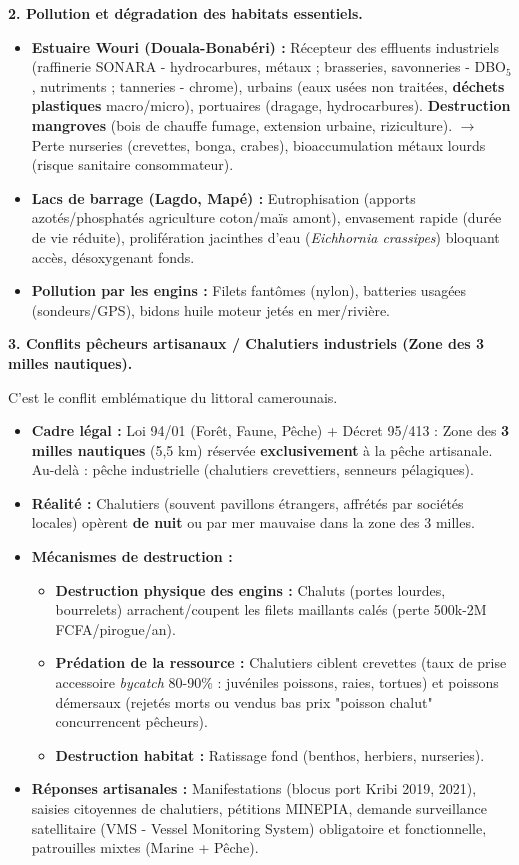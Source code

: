 \documentclass[11pt]{article}
\begin{document}
\textbf{2. Pollution et dégradation des habitats essentiels.}\par
\begin{itemize}
\item \textbf{Estuaire Wouri (Douala-Bonabéri) :} Récepteur des effluents industriels (raffinerie SONARA - hydrocarbures, métaux ; brasseries, savonneries - DBO$_5$, nutriments ; tanneries - chrome), urbains (eaux usées non traitées, \textbf{déchets plastiques} macro/micro), portuaires (dragage, hydrocarbures). \textbf{Destruction mangroves} (bois de chauffe fumage, extension urbaine, riziculture). $\rightarrow$ Perte nurseries (crevettes, bonga, crabes), bioaccumulation métaux lourds (risque sanitaire consommateur).
\item \textbf{Lacs de barrage (Lagdo, Mapé) :} Eutrophisation (apports azotés/phosphatés agriculture coton/maïs amont), envasement rapide (durée de vie réduite), prolifération jacinthes d'eau (\emph{Eichhornia crassipes}) bloquant accès, désoxygenant fonds.
\item \textbf{Pollution par les engins :} Filets fantômes (nylon), batteries usagées (sondeurs/GPS), bidons huile moteur jetés en mer/rivière.
\end{itemize}

\textbf{3. Conflits pêcheurs artisanaux / Chalutiers industriels (Zone des 3 milles nautiques).}\par
C'est le conflit emblématique du littoral camerounais.
\begin{itemize}
\item \textbf{Cadre légal :} Loi 94/01 (Forêt, Faune, Pêche) + Décret 95/413 : Zone des \textbf{3 milles nautiques} (5,5 km) réservée \textbf{exclusivement} à la pêche artisanale. Au-delà : pêche industrielle (chalutiers crevettiers, senneurs pélagiques).
\item \textbf{Réalité :} Chalutiers (souvent pavillons étrangers, affrétés par sociétés locales) opèrent \textbf{de nuit} ou par mer mauvaise dans la zone des 3 milles.
\item \textbf{Mécanismes de destruction :}
    \begin{itemize}
    \item \textbf{Destruction physique des engins :} Chaluts (portes lourdes, bourrelets) arrachent/coupent les filets maillants calés (perte 500k-2M FCFA/pirogue/an).
    \item \textbf{Prédation de la ressource :} Chalutiers ciblent crevettes (taux de prise accessoire \emph{bycatch} 80-90\% : juvéniles poissons, raies, tortues) et poissons démersaux (rejetés morts ou vendus bas prix "poisson chalut" concurrencent pêcheurs).
    \item \textbf{Destruction habitat :} Ratissage fond (benthos, herbiers, nurseries).
    \end{itemize}
\item \textbf{Réponses artisanales :} Manifestations (blocus port Kribi 2019, 2021), saisies citoyennes de chalutiers, pétitions MINEPIA, demande surveillance satellitaire (VMS - Vessel Monitoring System) obligatoire et fonctionnelle, patrouilles mixtes (Marine + Pêche).
\end{itemize}
\end{document}
